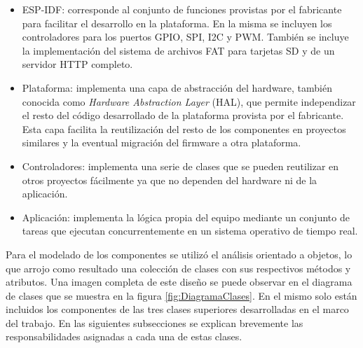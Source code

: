 \begin{itemize}
	\item ESP-IDF: corresponde al conjunto de funciones provistas por el fabricante para facilitar el desarrollo en la plataforma. En la misma se incluyen los controladores para los puertos GPIO, SPI, I2C y PWM. También se incluye la implementación del sistema de archivos FAT para tarjetas SD y de un servidor HTTP completo.

	\item Plataforma: implementa una capa de abstracción del hardware, también conocida como \emph{Hardware Abstraction Layer} (HAL), que permite independizar el resto del código desarrollado de la plataforma provista por el fabricante. Esta capa facilita la reutilización del resto de los componentes en proyectos similares y la eventual migración del firmware a otra plataforma.

	\item Controladores: implementa una serie de clases que se pueden reutilizar en otros proyectos fácilmente ya que no dependen del hardware ni de la aplicación.

	\item Aplicación: implementa la lógica propia del equipo mediante un conjunto de tareas que ejecutan concurrentemente en un sistema operativo de tiempo real.
\end{itemize}

Para el modelado de los componentes se utilizó el análisis orientado a objetos, lo que arrojo como resultado una colección de clases con sus respectivos métodos y atributos. Una imagen completa de este diseño se puede observar en el diagrama de clases que se muestra en la figura \ref{fig:DiagramaClases}. En el mismo solo están incluidos los componentes de las tres clases superiores desarrolladas en el marco del trabajo. En las siguientes subsecciones se explican brevemente las responsabilidades asignadas a cada una de estas clases.

